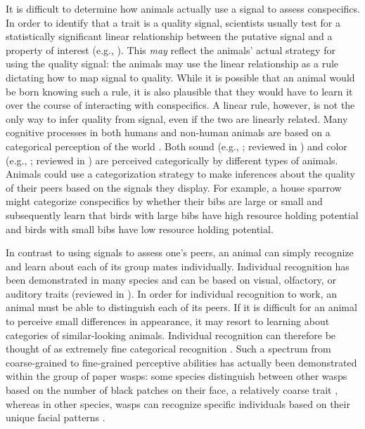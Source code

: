 It is difficult to determine how animals actually use a signal to assess conspecifics. In order to identify that a trait is a quality signal, scientists usually test for a statistically significant linear relationship between the putative signal and a property of interest (e.g., \citep{Rohwer:1981vn,Rohwer:1982fk,Ripoll:2004vn,Tibbetts:2004kx}). This \emph{may} reflect the animals' actual strategy for using the quality signal: the animals may use the linear relationship as a rule dictating how to map signal to quality. While it is possible that an animal would be born knowing such a rule, it is also plausible that they would have to learn it over the course of interacting with conspecifics. A linear rule, however, is not the only way to infer quality from signal, even if the two are linearly related. Many cognitive processes in both humans and non-human animals are based on a categorical perception of the world \citep{Harnad:1990ux}. Both sound (e.g., \citep{Wyttenbach:1996wj,Nelson:1989rt}; reviewed in \citep{Bornstein:1987ec,Ehret:1987jh}) and color (e.g., \citep{Lim:2016ye}; reviewed in \citep{Bornstein:1987ec}) are perceived categorically by different types of animals. Animals could use a categorization strategy to make inferences about the quality of their peers based on the signals they display. For example, a house sparrow might categorize conspecifics by whether their bibs are large or small and subsequently learn that birds with large bibs have high resource holding potential and birds with small bibs have low resource holding potential.
 
In contrast to using signals to assess one's peers, an animal can simply recognize and learn about each of its group mates individually. Individual recognition has been demonstrated in many species and can be based on visual, olfactory, or auditory traits (reviewed in \citep{Tibbetts2007IndividualDifferent}). In order for individual recognition to work, an animal must be able to distinguish each of its peers. If it is difficult for an animal to perceive small differences in appearance, it may resort to learning about categories of similar-looking animals. Individual recognition can therefore be thought of as extremely fine categorical recognition \citep{Barnard:1979fk}. Such a spectrum from coarse-grained to fine-grained perceptive abilities has actually been demonstrated within the group of paper wasps: some species distinguish between other wasps based on the number of black patches on their face, a relatively coarse trait \citep{Tibbetts:2004kx}, whereas in other species, wasps can recognize specific individuals based on their unique facial patterns \citep{Tibbetts:2002ys}. 

